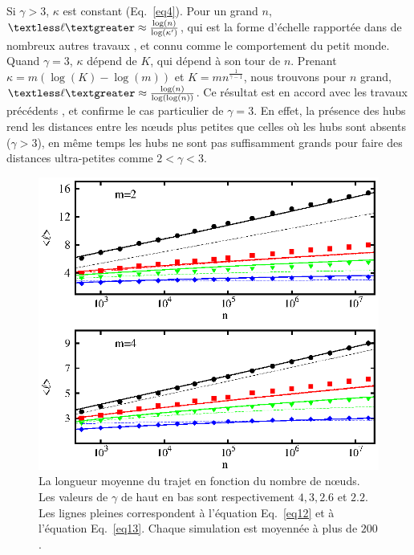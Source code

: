 Si $\gamma>3$, $\kappa$ est constant (Eq.~\eqref{eq4}). Pour un grand $n$, $\textless\ell\textgreater\approx\frac{\log(n)} {\log (\kappa')}$, qui est la forme d'échelle rapportée dans de nombreux autres travaux \cite{Bollobas1985,Chung-Lu2002,Fronczak-al2004,Hofstad-al2004,Cohen-Havlin2009}, et connu comme le comportement du petit monde. \\
Quand $\gamma=3$, $\kappa$ dépend de $K$, qui dépend à son tour de $n$. Prenant $\kappa=m(\log(K)-\log(m))$ et $K=mn^{\frac{1}{\gamma-1}}$, nous trouvons pour  $n$ grand, $\textless\ell\textgreater\approx \frac{\log(n)} {\log(\log(n))} $. Ce résultat est en accord avec les travaux précédents \cite {Chung-Lu2002,Cohen-Havlin2003,Fronczak-al2004,Bollobas-Riodan2002}, et confirme le cas particulier de $ \gamma = 3 $. En effet, la présence des hubs rend les distances entre les nœuds plus petites que celles où les hubs sont absents ($\gamma>3$), en même temps les hubs ne sont pas suffisamment grands pour faire des distances ultra-petites comme $2<\gamma<3$.

\begin{figure}[h]
	\centering
	\includegraphics[scale=1.2]{./figures/fig4-3}
	\caption{La longueur moyenne du trajet en fonction du nombre de nœuds. Les valeurs de $\gamma$ de haut en bas sont respectivement $ 4, 3, 2.6 $ et $ 2.2 $. Les lignes pleines correspondent à l'équation Eq.~\eqref{eq12} et à l'équation Eq.~\eqref{eq13}. Chaque simulation est moyennée à plus de $200 $.}
	\label{fig4-3}
\end{figure}  
 

